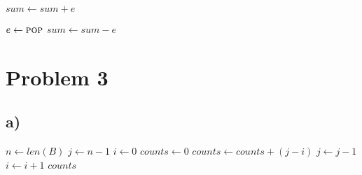 \documentclass[12pt]{article}
\begin{document}
\begin{algorithm*}
    \begin{algorithmic}[1]
    
        \State $sum \gets sum + e$
        \State {}
    \EndFunction
    
    \end{algorithmic}
\end{algorithm*}

\begin{algorithm*}
    \begin{algorithmic}[1]
    
        \State $e \gets \Call{pop}{}$
        \State $sum \gets sum - e$
    \EndFunction
    
    \end{algorithmic}
\end{algorithm*}

\begin{algorithm*}
    \begin{algorithmic}[1]
    
        \State {}
    \EndFunction
    
    \end{algorithmic}
\end{algorithm*}


\newpage

\section*{Problem 3}
\subsection*{a)}
\begin{algorithm}
    \begin{algorithmic}[1]
        \State $n \gets len(B)$
        \State $j \gets n - 1$
        \State $i \gets 0$
        \State $counts \gets 0$
                \State $counts \gets counts + (j - i)$
                \State $j \gets j - 1$
            \Else
                \State $i \gets i + 1$
            \EndIf
        \EndWhile
        \State \Return $counts$
    \EndFunction
    \end{algorithmic}
\end{algorithm}
\end{document}
